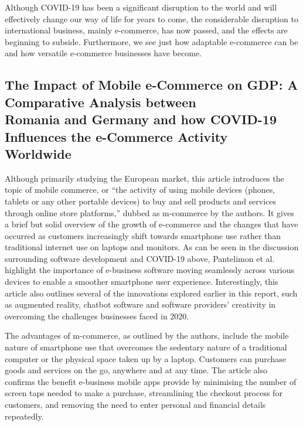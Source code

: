 \documentclass[12pt]{article}
\begin{document}
Although COVID-19 has been a significant disruption to the world and will effectively change our way of life for years to come, the considerable disruption to international business, mainly e-commerce, has now passed, and the effects are beginning to subside. Furthermore, we see just how adaptable e-commerce can be and how versatile e-commerce businesses have become. \par

\subsection{The Impact of Mobile e-Commerce on GDP: A Comparative Analysis between \\ Romania and Germany and how COVID-19 Influences the e-Commerce Activity \\ Worldwide \cite{pantelimon}}

Although primarily studying the European market, this article introduces the topic of mobile commerce, or “the activity of using mobile devices (phones, tablets or any other portable devices) to buy and sell products and services through online store platforms,” dubbed as m-commerce by the authors. It gives a brief but solid overview of the growth of e-commerce and the changes that have occurred as customers increasingly shift towards smartphone use rather than traditional internet use on laptops and monitors. As can be seen in the discussion surrounding software development and COVID-19 above, Pantelimon et al. highlight the importance of e-business software moving seamlessly across various devices to enable a smoother smartphone user experience. Interestingly, this article also outlines several of the innovations explored earlier in this report, such as augmented reality, chatbot software and software providers’ creativity in overcoming the challenges businesses faced in 2020. \par 

The advantages of m-commerce, as outlined by the authors, include the mobile nature of smartphone use that overcomes the sedentary nature of a traditional computer or the physical space taken up by a laptop. Customers can purchase goods and services on the go, anywhere and at any time. The article also confirms the benefit e-business mobile apps provide by minimising the number of screen taps needed to make a purchase, streamlining the checkout process for customers, and removing the need to enter personal and financial details repeatedly. \par 
\end{document}
